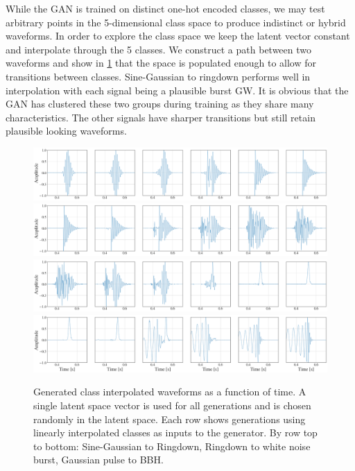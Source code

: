 \documentclass[12pt]{iopart}
\begin{document}
While the \ac{GAN} is trained on distinct one-hot encoded classes, we may test arbitrary points in the 5-dimensional class space to produce indistinct or hybrid waveforms. In order to explore the class space we keep the latent vector constant and
interpolate through the 5 classes. We construct a path between two waveforms
and show in \cref{fig:c_interp} that the space is populated enough to allow for transitions between
classes.  Sine-Gaussian to ringdown performs well in interpolation with each
signal being a plausible burst GW. It is obvious that the GAN has clustered
these two groups during training as they share many characteristics. The other
signals have sharper transitions but still retain plausible looking waveforms.
%
\begin{figure}[!h]
    \centering
    \includegraphics[width=\textwidth]{figures/generations/sg-rd.png}
    \includegraphics[width=\textwidth]{figures/generations/rd-wnb.png}
    \includegraphics[width=\textwidth]{figures/generations/wnb-blip.png}
    \includegraphics[width=\textwidth]{figures/generations/blip-bbh.png}
    \caption{Generated class interpolated waveforms as a function of time. A single latent space vector is used for all generations and is chosen randomly in the latent space. Each row shows generations using linearly interpolated classes as inputs to the generator. By row top to bottom: Sine-Gaussian to Ringdown, Ringdown to white noise burst, Gaussian pulse to BBH.}
    \label{fig:c_interp}
\end{figure}
%
\end{document}
